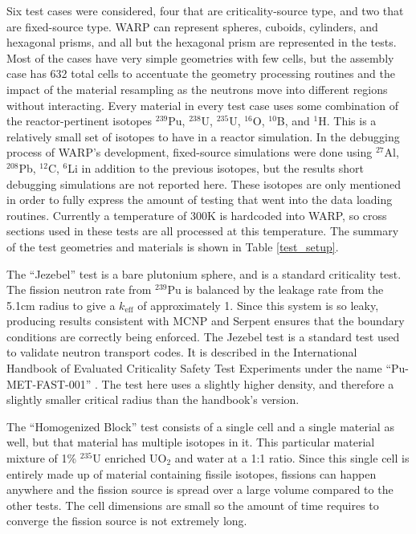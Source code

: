 Six test cases were considered, four that are criticality-source type, and two that are fixed-source type.  WARP can represent spheres, cuboids, cylinders, and hexagonal prisms, and all but the hexagonal prism are represented in the tests.  Most of the cases have very simple geometries with few cells, but the assembly case has 632 total cells to accentuate the geometry processing routines and the impact of the material resampling as the neutrons move into different regions without interacting.  Every material in every test case uses some combination of the reactor-pertinent isotopes $^{239}$Pu, $^{238}$U, $^{235}$U, $^{16}$O, $^{10}$B, and $^{1}$H.  This is a relatively small set of isotopes to have in a reactor simulation.  In the debugging process of WARP's development, fixed-source simulations were done using $^{27}$Al, $^{208}$Pb, $^{12}$C, $^{6}$Li in addition to the previous isotopes, but the results short debugging simulations are not reported here.  These isotopes are only mentioned in order to fully express the amount of testing that went into the data loading routines. %
 Currently a temperature of 300K is hardcoded into WARP, so cross sections used in these tests are all processed at this temperature.   The summary of the test geometries and materials is shown in Table \ref{test_setup}.  

The ``Jezebel'' test is a bare plutonium sphere, and is a standard criticality test.   The fission neutron rate from $^{239}$Pu is balanced by the leakage rate from the 5.1cm radius to give a $k_\mathrm{eff}$ of approximately 1.  Since this system is so leaky, producing results consistent with MCNP and Serpent ensures that the boundary conditions are correctly being enforced.  The Jezebel test is a standard test used to validate neutron transport codes.  It is described in the International Handbook of Evaluated Criticality Safety Test Experiments under the name ``Pu-MET-FAST-001'' \cite{bench_handbook}.  The test here uses a slightly higher density, and therefore a slightly smaller critical radius than the handbook's version.

The ``Homogenized Block'' test consists of a single cell and a single material as well, but that material has multiple isotopes in it.  This particular material mixture of 1\% $^{235}$U enriched UO$_2$ and water at a 1:1 ratio.  Since this single cell is entirely made up of material containing fissile isotopes, fissions can happen anywhere and the fission source is spread over a large volume compared to the other tests.  The cell dimensions are small so the amount of time requires to converge the fission source is not extremely long.

